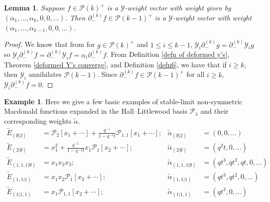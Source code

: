 \documentclass[11pt]{article}
\newtheorem{lemm}[theo]{Lemma}
\theoremstyle{definition}
\newtheorem{exam}[theo]{Example}
\numberwithin{equation}{section}
\newcommand{\y}{{ \mathscr{Y} }}
\begin{document}
\begin{lemm} \label{weight vectors and lowering}
Suppose $f \in \mathcal{P}(k)^{+}$ is a $\y$-weight vector with weight given by $(\alpha_1,\ldots,\alpha_k,0,0,\ldots)$. Then $\partial_{-}^{(k)} f \in \mathcal{P}(k-1)^{+}$ is a $\y$-weight vector with weight $(\alpha_1,\ldots,\alpha_{k-1},0,0,\ldots)$. 
\end{lemm}

\begin{proof}
We know that from \cite[Section 7, Thm. 7.13, page 36]{Ion_2022} for $g \in \mathcal{P}(k)^{+}$ and $1\leq i \leq k-1$, $\y_i \partial_{-}^{(k)} g = \partial_{-}^{(k)}\y_i g$ so $\y_i\partial_{-}^{(k)} f = \partial_{-}^{(k)}\y_i f = \alpha_i \partial_{-}^{(k)} f.$
From Definition \ref{defn of deformed y's}, Theorem \ref{deformed Y's converge}, and Definition \ref{defn6}, we have that if $i\geq k$, then $\y_i$ annihilates $\mathscr{P}(k-1)$.
Since $\partial_{-}^{(k)}f \in \mathcal{P}(k-1)^{+}$ for all $i \geq k$, $\y_i \partial_{-}^{(k)}f = 0$.
\end{proof}

\begin{exam}
Here we give a few basic examples of stable-limit non-symmetric Macdonald functions expanded in the Hall--Littlewood basis $\mathcal{P}_{\lambda}$ and their corresponding weights $\widetilde\alpha$.
\begin{align*}
      \widetilde{E}_{(\emptyset|2)} &= \mathcal{P}_{2}[x_1+ \cdots] +\frac{q^{-1}}{1-q^{-1}t}\mathcal{P}_{1,1}[x_1+ \cdots]; & %
    \widetilde{\alpha}_{(\emptyset|2)} &= (0,0,\ldots) \\
     \widetilde{E}_{(2|\emptyset)} &= x_1^2 + \frac{q^{-1}}{1-q^{-1}t}x_1 \mathcal{P}_1[x_2+ \cdots]; & %
    \widetilde{\alpha}_{(2|\emptyset)} &= (q^2t,0,\ldots) \\
     \widetilde{E}_{(1,1,1|\emptyset)} &= x_1x_2x_3; & %
    \widetilde{\alpha}_{(1,1,1|\emptyset)} &=(qt^3,qt^2,qt,0,\ldots) \\
     \widetilde{E}_{(1,1|1)} &= x_1x_2\mathcal{P}_1[x_3+ \cdots]; & %
    \widetilde{\alpha}_{(1,1|1)} &= (qt^3,qt^2,0,\ldots) \\
     \widetilde{E}_{(1|1,1)} &= x_1\mathcal{P}_{1,1}[x_2+\cdots]; & %
    \widetilde{\alpha}_{(1|1,1)} &= (qt^3,0,\ldots)
\end{align*}
\end{exam}
\end{document}

